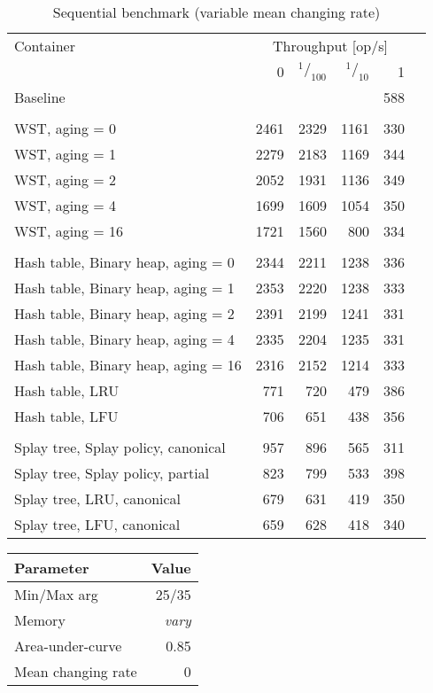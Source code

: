 \begin{table}
\caption{Sequential benchmark (variable mean changing rate)}
\begin{tabular}[]{l r r r r r} \toprule
Container & \multicolumn{4}{c}{Throughput [op/s]} \\ \cmidrule(r){2-5}
& 0 & $^1/_{100}$ & $^1/_{10}$ & 1 \\ \midrule
Baseline & \multicolumn{4}{r}{588}  \\
\\
WST, aging = 0 & 2461 & 2329 & 1161 & 330 \\
WST, aging = 1 & 2279 & 2183 & 1169 & 344 \\
WST, aging = 2 & 2052 & 1931 & 1136 & 349 \\
WST, aging = 4 & 1699 & 1609 & 1054 & 350 \\
WST, aging = 16 & 1721 & 1560 & 800 & 334 \\
\\
Hash table, Binary heap, aging = 0 & 2344 & 2211 & 1238 & 336 \\
Hash table, Binary heap, aging = 1 & 2353 & 2220 & 1238 & 333 \\
Hash table, Binary heap, aging = 2 & 2391 & 2199 & 1241 & 331 \\
Hash table, Binary heap, aging = 4 & 2335 & 2204 & 1235 & 331 \\
Hash table, Binary heap, aging = 16 & 2316 & 2152 & 1214 & 333 \\
Hash table, LRU & 771 & 720 & 479 & 386 \\
Hash table, LFU & 706 & 651 & 438 & 356 \\
\\
Splay tree, Splay policy, canonical & 957 & 896 & 565 & 311 \\
Splay tree, Splay policy, partial & 823 & 799 & 533 & 398 \\
Splay tree, LRU, canonical & 679 & 631 & 419 & 350 \\
Splay tree, LFU, canonical & 659 & 628 & 418 & 340 \\
\bottomrule
\end{tabular}
\end{table}

\pagebreak

\begin{tabular}[h]{l r} \toprule
Parameter & Value \\ \midrule
Min/Max arg & 25/35 \\
Memory & \emph{vary} \\
Area-under-curve & 0.85 \\
Mean changing rate & 0 \\ \bottomrule
\end{tabular}

